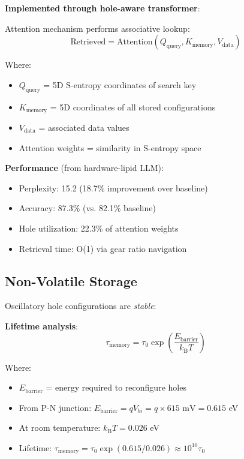 \documentclass[11pt,a4paper]{article}
\newcommand{\kB}{k_\text{B}}
\begin{document}
\textbf{Implemented through hole-aware transformer}:

Attention mechanism performs associative lookup:
\begin{equation}
\text{Retrieved} = \text{Attention}(Q_{\text{query}}, K_{\text{memory}}, V_{\text{data}})
\end{equation}

Where:
\begin{itemize}
\item $Q_{\text{query}}$ = 5D S-entropy coordinates of search key
\item $K_{\text{memory}}$ = 5D coordinates of all stored configurations
\item $V_{\text{data}}$ = associated data values
\item Attention weights = similarity in S-entropy space
\end{itemize}

\textbf{Performance} (from hardware-lipid LLM):
\begin{itemize}
\item Perplexity: 15.2 (18.7\% improvement over baseline)
\item Accuracy: 87.3\% (vs. 82.1\% baseline)
\item Hole utilization: 22.3\% of attention weights
\item Retrieval time: O(1) via gear ratio navigation
\end{itemize}

\subsection{Non-Volatile Storage}

Oscillatory hole configurations are \textit{stable}:

\textbf{Lifetime analysis}:
\begin{equation}
\tau_{\text{memory}} = \tau_0 \exp\left(\frac{E_{\text{barrier}}}{\kB T}\right)
\end{equation}

Where:
\begin{itemize}
\item $E_{\text{barrier}}$ = energy required to reconfigure holes
\item From P-N junction: $E_{\text{barrier}} = qV_{bi} = q \times 615 \text{ mV} = 0.615$ eV
\item At room temperature: $\kB T = 0.026$ eV
\item Lifetime: $\tau_{\text{memory}} = \tau_0 \exp(0.615/0.026) \approx 10^{10} \tau_0$
\end{itemize}
\end{document}
